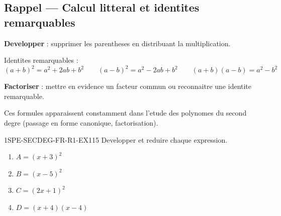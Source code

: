 

\subsection*{Rappel — Calcul litteral et identites remarquables}

\textbf{Developper} : supprimer les parentheses en distribuant la multiplication.

Identites remarquables :
\[
  (a+b)^2 = a^2 + 2ab + b^2 \qquad (a-b)^2 = a^2 - 2ab + b^2 \qquad (a+b)(a-b) = a^2 - b^2
\]

\textbf{Factoriser} : mettre en evidence un facteur commun ou reconnaitre une identite remarquable.

Ces formules apparaissent constamment dans l'etude des polynomes du second degre (passage en forme canonique, factorisation).


\begin{exercice}{1SPE-SECDEG-FR-R1-EX1}{1}{5}
Developper et reduire chaque expression.
\begin{enumerate}
  \item $A = (x + 3)^2$
  \item $B = (x - 5)^2$
  \item $C = (2x + 1)^2$
  \item $D = (x + 4)(x - 4)$
\end{enumerate}
\end{exercice}



